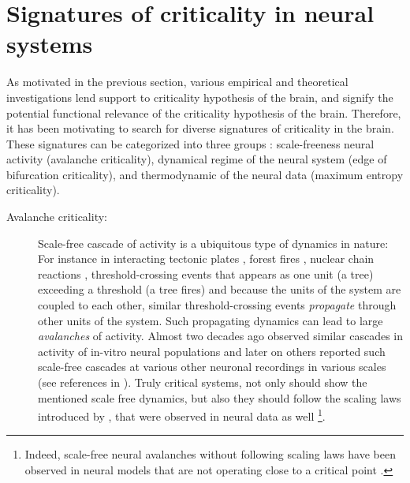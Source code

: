 \section{Signatures of criticality in neural systems}\label{sec:sign-crit-neur}
As motivated in the previous section,
various empirical and theoretical investigations lend support to criticality hypothesis of the brain,
and signify the potential functional relevance of the criticality hypothesis of the brain.
Therefore, it has been motivating to search for diverse signatures of criticality in the brain.
These signatures can be categorized into three groups \cite{zeraatiStudyingCriticalityIts2017}:
scale-freeness neural activity (avalanche criticality),
dynamical regime of the neural system (edge of bifurcation criticality),
and thermodynamic of the neural data (maximum entropy criticality).
\begin{description}

\item[Avalanche criticality:]
  Scale-free cascade of activity is a ubiquitous type of dynamics in nature:
  For instance in interacting tectonic plates \cite{gutenbergEarthquakeMagnitudeIntensity1956},
  forest fires \cite{malamudForestFiresExample1998},
  nuclear chain reactions \cite{harrisTheoryBranchingProcesses1963},
  threshold-crossing events that appears as one unit (\eg a tree) exceeding a threshold (\eg a tree fires)
  and because the units of the system are coupled to each other,
  similar threshold-crossing events \emph{propagate} through other units of the system.
  Such propagating dynamics can lead to large \emph{avalanches} of activity.
  Almost two decades ago \citet{beggsNeuronalAvalanchesNeocortical2003} observed similar cascades in activity of in-vitro neural populations
  and later on others reported such scale-free cascades at various other neuronal recordings in various scales (see references in
  \cite{munozColloquiumCriticalityDynamical2018,agrawalScaleChangeSymmetryRules2019}).
  Truly critical systems, not only should show the mentioned scale free dynamics,
  but also they should follow the scaling laws introduced by \citet{sethnaCracklingNoise2001b},
  that were observed in neural data \cite{friedmanUniversalCriticalDynamics2012} as well
  \footnote{
    Indeed, scale-free neural avalanches without following scaling laws have been observed in neural models that are not operating close to a critical point 
  \cite{aitchisonZipfLawArises2016a,touboulPowerlawStatisticsUniversal2017}.}.


\end{description}
